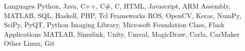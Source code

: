 
\begin{cvskills}
  \cvskill
    {Languages} %
    {Python, Java, C++, C\#, C, HTML, Javascript, ARM Assembly, MATLAB, SQL, Haskell, PHP, Tcl} %
  \cvskill
    {Frameworks} %
    {ROS, OpenCV, Keras, NumPy, SciPy, PyQT, Python Imaging Library, Microsoft Foundation Class, Flask} %
  \cvskill
    {Applications} %
    {MATLAB, Simulink, Unity, Unreal, MagicDraw, Carla, CarMaker} %
  \cvskill
    {Other} 
    {Linux, Git}
\end{cvskills}